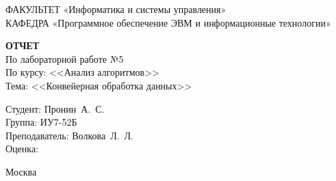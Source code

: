 \begin{titlepage}
	{\doublespacing \small \raggedright ФАКУЛЬТЕТ \hspace{25mm} «Информатика и системы управления»\\
	КАФЕДРА \hspace{5mm} «Программное обеспечение ЭВМ и информационные технологии»\\}

	\vspace{30mm}
	
	\textbf{ОТЧЕТ}\\
	По лабораторной работе №5\\
	По курсу: <<Анализ алгоритмов>>\\
	Тема: <<Конвейерная обработка данных>>\\

	\vspace{60mm}

	\hspace{70mm} Студент:       \hfill Пронин~А.~С.\\
	\hspace{70mm} Группа:        \hfill ИУ7-52Б\\
	\hspace{70mm} Преподаватель: \hfill Волкова~Л.~Л.\\
	\hspace{70mm} Оценка:        \hfill \hrulefill\\

	\vfill
	
	Москва\\
	\the\year
\end{titlepage}

\setcounter{page}{2}